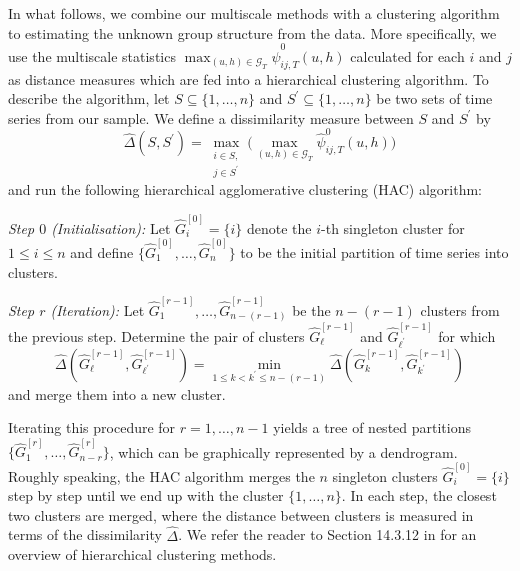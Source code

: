 \documentclass[12pt]{article}
\begin{document}
In what follows, we combine our multiscale methods with a clustering algorithm to estimating the unknown group structure from the data. More specifically, we use the multiscale statistics $\max_{(u, h) \in \mathcal{G}_T}\hat{\psi}^0_{ij, T}(u, h)$ calculated for each $i$ and $j$ as distance measures which are fed into a hierarchical clustering algorithm. To describe the algorithm, let $S \subseteq \{1,\ldots, n\}$ and $S^\prime \subseteq \{1,\ldots, n\}$ be two sets of time series from our sample. We define a dissimilarity measure between $S$ and $S^\prime$ by 
\begin{equation}\label{dissimilarity}
\widehat{\Delta}(S,S^\prime) = \max_{\substack{i \in S, \\ j \in S^\prime}} \Big(\max_{(u, h) \in \mathcal{G}_T}\hat{\psi}^0_{ij, T}(u, h)\Big) 
\end{equation}
and run the following hierarchical agglomerative clustering (HAC) algorithm: 
\vspace{3pt}

\noindent \textit{Step $0$ (Initialisation):} Let $\widehat{G}_i^{[0]} = \{ i \}$ denote the $i$-th singleton cluster for $1 \le i \le n$ and define $\{\widehat{G}_1^{[0]},\ldots,\widehat{G}_n^{[0]} \}$ to be the initial partition of time series into clusters. 

\noindent \textit{Step $r$ (Iteration):} Let $\widehat{G}_1^{[r-1]},\ldots,\widehat{G}_{n-(r-1)}^{[r-1]}$ be the $n-(r-1)$ clusters from the previous step. Determine the pair of clusters $\widehat{G}_{\ell}^{[r-1]}$ and $\widehat{G}_{{\ell}^\prime}^{[r-1]}$ for which 
\[ \widehat{\Delta}(\widehat{G}_{\ell}^{[r-1]},\widehat{G}_{{\ell}^\prime}^{[r-1]}) = \min_{1 \le k < k^\prime \le n-(r-1)} \widehat{\Delta}(\widehat{G}_{k}^{[r-1]},\widehat{G}_{k^\prime}^{[r-1]}) \]  
and merge them into a new cluster. 
\vspace{3pt}

\noindent Iterating this procedure for $r = 1,\ldots, n-1$ yields a tree of nested partitions $\{\widehat{G}_1^{[r]},\ldots,\widehat{G}_{n-r}^{[r]}\}$, which can be graphically represented by a dendrogram. Roughly speaking, the HAC algorithm merges the $n$ singleton clusters $\widehat{G}_i^{[0]} = \{ i \}$ step by step until we end up with the cluster $\{1,\ldots, n\}$. In each step, the closest two clusters are merged, where the distance between clusters is measured in terms of the dissimilarity $\widehat{\Delta}$. We refer the reader to Section 14.3.12 in \cite{HastieTibshiraniFriedman2009} for an overview of hierarchical clustering methods. 
\end{document}
